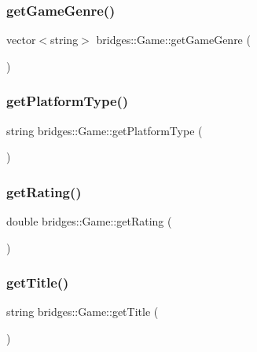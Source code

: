\subsubsection{\texorpdfstring{get\+Game\+Genre()}{getGameGenre()}}
{\footnotesize\ttfamily vector$<$string$>$ bridges\+::\+Game\+::get\+Game\+Genre (\begin{DoxyParamCaption}{ }\end{DoxyParamCaption})\hspace{0.3cm}{\ttfamily [inline]}}

\hypertarget{classbridges_1_1_game_a6b7ff7e0fa411787338c70942cf0ebcb}{}\label{classbridges_1_1_game_a6b7ff7e0fa411787338c70942cf0ebcb} 
\subsubsection{\texorpdfstring{get\+Platform\+Type()}{getPlatformType()}}
{\footnotesize\ttfamily string bridges\+::\+Game\+::get\+Platform\+Type (\begin{DoxyParamCaption}{ }\end{DoxyParamCaption})\hspace{0.3cm}{\ttfamily [inline]}}

\hypertarget{classbridges_1_1_game_a8deb9c403f2e16bede39a1486829742d}{}\label{classbridges_1_1_game_a8deb9c403f2e16bede39a1486829742d} 
\subsubsection{\texorpdfstring{get\+Rating()}{getRating()}}
{\footnotesize\ttfamily double bridges\+::\+Game\+::get\+Rating (\begin{DoxyParamCaption}{ }\end{DoxyParamCaption})\hspace{0.3cm}{\ttfamily [inline]}}

\hypertarget{classbridges_1_1_game_a66917b204312a7996585e5d4b56a1add}{}\label{classbridges_1_1_game_a66917b204312a7996585e5d4b56a1add} 
\subsubsection{\texorpdfstring{get\+Title()}{getTitle()}}
{\footnotesize\ttfamily string bridges\+::\+Game\+::get\+Title (\begin{DoxyParamCaption}{ }\end{DoxyParamCaption})\hspace{0.3cm}{\ttfamily [inline]}}

